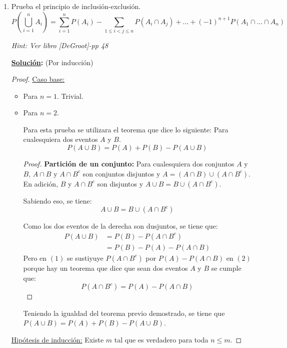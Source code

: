 \documentclass[11pt,letterpaper]{report}
\newcommand{\sol}{\textbf{\underline{Solución}: }} %
\begin{document}
\begin{enumerate}
\begin{proof}
\begin{itemize}
    \item  Transitiva
    
    TODO
    \end{itemize}
\end{proof}

\item Prueba el principio de inclusión-exclusión.
\[
    P(\bigcup_{i=1}^{n} A_i) = \sum_{i=1}^{n} P(A_i) - \sum_{1 \leq i < j \leq n } P(A_i \cap A_j)
    + \ldots + (-1)^{n+1} P(A_1 \cap \ldots \cap A_n) \tag{$\heartsuit$}
\]

\textit{Hint: Ver libro [DeGroot]-pp 48}

\sol (Por inducción)
\begin{proof}
\underline{Caso base:}
\begin{itemize}
    \item Para $n=1$. Trivial.
    \item Para $n=2$.
    
    Para esta prueba se utilizara el teorema que dice lo siguiente: Para cualesquiera dos eventos
    $A$ y $B$.
    \[
        P(A \cup B) = P(A) + P(B) - P(A \cup B) \tag{*}
    \]
    \begin{proof}
        \textbf{Partición de un conjunto:} Para cualesquiera dos conjuntos $A$ y $B$, $A \cap B$
        y $A \cap B^c$ son conjuntos disjuntos y $A = (A \cap B) \cup (A \cap B^c)$. En adición,
        $B$ y $A \cap B^c$ son disjuntos y $A \cup B = B \cup (A \cap B^c)$.


        Sabiendo eso, se tiene:
        $$A \cup B = B \cup (A \cap B^c)$$

        Como los dos eventos de la derecha son dusjuntos, se tiene que:
        \begin{align*}
            P(A \cup B) &=  P(B) - P(A \cap B^c) \tag{1}\\
                &= P(B) - P(A) - P(A \cap B) \tag{2}
        \end{align*}
        Pero en $(1)$ se sustiyuye $P(A \cap B^c)$ por $P(A) - P(A \cap B)$ en $(2)$porque hay un
        teorema que dice que sean dos eventos $A$ y $B$ se cumple que:
        $$P(A \cap B^c) = P(A) - P(A \cap B)$$
    \end{proof}
    Teniendo la igualdad del teorema previo demostrado, se tiene que 
    $P(A \cup B) = P(A) + P(B) - P(A \cup B)$.
\end{itemize}

\underline{Hipótesis de inducción:} Existe $m$ tal que es verdadero para toda $n \leq m$.


\end{proof}
\end{enumerate}
\end{document}
